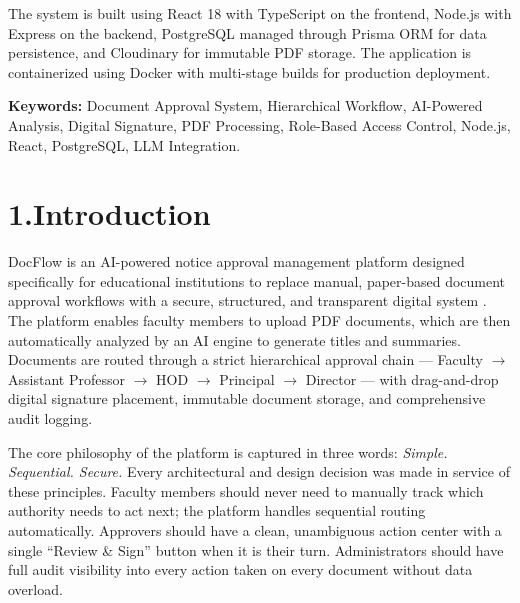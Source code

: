 \documentclass[12pt,a4paper]{report}
\newcommand{\citeref}[1]{%
  \textcolor{citeborder}{%
    \fboxsep=2pt%
    \fcolorbox{citeborder}{citebg}{\footnotesize\bfseries[#1]}%
  }%
}
\begin{document}
The system is built using React 18 with TypeScript on the frontend, Node.js with Express on the backend, PostgreSQL managed through Prisma ORM for data persistence, and Cloudinary for immutable PDF storage. The application is containerized using Docker with multi-stage builds for production deployment.

\vspace{0.5cm}
\noindent\textbf{Keywords:} Document Approval System, Hierarchical Workflow, AI-Powered Analysis, Digital Signature, PDF Processing, Role-Based Access Control, Node.js, React, PostgreSQL, LLM Integration.

\newpage
\pagestyle{empty}
\tableofcontents

\newpage
\setcounter{page}{1}
\pagestyle{mainstyle}

\chapter*{1.\quad Introduction}

DocFlow is an AI-powered notice approval management platform designed specifically for educational institutions to replace manual, paper-based document approval workflows with a secure, structured, and transparent digital system \citeref{1}. The platform enables faculty members to upload PDF documents, which are then automatically analyzed by an AI engine \citeref{2} to generate titles and summaries. Documents are routed through a strict hierarchical approval chain --- Faculty $\rightarrow$ Assistant Professor $\rightarrow$ HOD $\rightarrow$ Principal $\rightarrow$ Director --- with drag-and-drop digital signature placement, immutable document storage, and comprehensive audit logging.

The core philosophy of the platform is captured in three words: \textit{Simple. Sequential. Secure.} Every architectural and design decision was made in service of these principles. Faculty members should never need to manually track which authority needs to act next; the platform handles sequential routing automatically. Approvers should have a clean, unambiguous action center with a single ``Review \& Sign'' button when it is their turn. Administrators should have full audit visibility into every action taken on every document without data overload.
\end{document}
